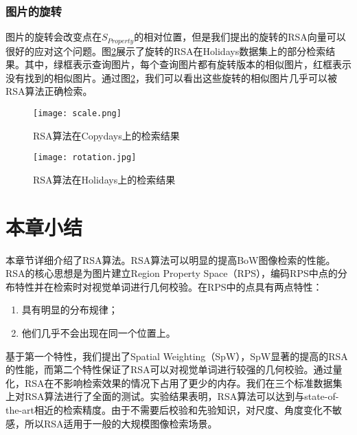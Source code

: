 \subsubsection{图片的旋转}
图片的旋转会改变点在$S_{Property}$的相对位置，但是我们提出的旋转的RSA向量可以很好的应对这个问题。图\ref{fig:rsa_r}展示了旋转的RSA在Holidays数据集上的部分检索结果。其中，绿框表示查询图片，每个查询图片都有旋转版本的相似图片，红框表示没有找到的相似图片。通过图\ref{fig:rsa_r}，我们可以看出这些旋转的相似图片几乎可以被RSA算法正确检索。

\begin{figure}[h]
	\centering
	\texttt{[image: scale.png]}
	\caption{RSA算法在Copydays上的检索结果}\label{fig:rsa_s}
\end{figure}

\begin{figure}[h]
	\centering
	\texttt{[image: rotation.jpg]}
	\caption{RSA算法在Holidays上的检索结果}\label{fig:rsa_r}
\end{figure}

\section{本章小结}
本章节详细介绍了RSA算法。RSA算法可以明显的提高BoW图像检索的性能。RSA的核心思想是为图片建立Region Property Space（RPS），编码RPS中点的分布特性并在检索时对视觉单词进行几何校验。在RPS中的点具有两点特性：
\begin{enumerate}
	\item 具有明显的分布规律；
	\item 他们几乎不会出现在同一个位置上。
\end{enumerate}
基于第一个特性，我们提出了Spatial Weighting（SpW），SpW显著的提高的RSA的性能，而第二个特性保证了RSA可以对视觉单词进行较强的几何校验。通过量化，RSA在不影响检索效果的情况下占用了更少的内存。我们在三个标准数据集上对RSA算法进行了全面的测试。实验结果表明，RSA算法可以达到与state-of-the-art相近的检索精度。由于不需要后校验和先验知识，对尺度、角度变化不敏感，所以RSA适用于一般的大规模图像检索场景。




